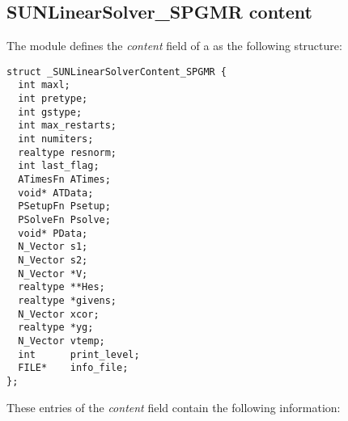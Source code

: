 \subsection{SUNLinearSolver\_SPGMR content}
\label{ss:sunlinsol_spgmr_content}

The {\sunlinsolspgmr} module defines the \textit{content} field of a
 as the following structure:
\begin{verbatim}
struct _SUNLinearSolverContent_SPGMR {
  int maxl;
  int pretype;
  int gstype;
  int max_restarts;
  int numiters;
  realtype resnorm;
  int last_flag;
  ATimesFn ATimes;
  void* ATData;
  PSetupFn Psetup;
  PSolveFn Psolve;
  void* PData;
  N_Vector s1;
  N_Vector s2;
  N_Vector *V;
  realtype **Hes;
  realtype *givens;
  N_Vector xcor;
  realtype *yg;
  N_Vector vtemp;
  int      print_level;
  FILE*    info_file;
};
\end{verbatim}
These entries of the \emph{content} field contain the following
information:
